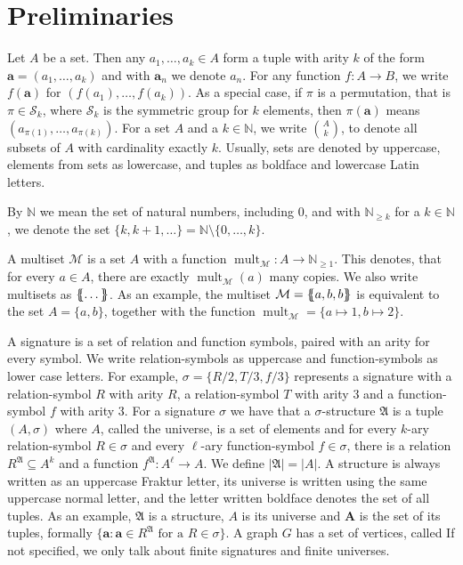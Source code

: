 \section{Preliminaries}
\label{sec:Preliminaries}

Let $A$ be a set.
Then any $a_1,\dots, a_k\in A$ form a tuple with arity $k$ of the form $\mathbf a=(a_1,\dots,a_k)$ and with $\mathbf a_n$ we denote $a_n$.
For any function $f:A\to B$, we write $f(\mathbf a)$ for $(f(a_1),\dots,f(a_k))$.
As a special case, if $\pi$ is a permutation, that is $\pi\in \mathcal S_k$, where $\mathcal S_k$ is the symmetric group for $k$ elements, then $\pi(\mathbf a)$ means $(a_{\pi(1)},\dots,a_{\pi(k)})$.
For a set $A$ and a $k\in \mathbb N$, we write $\binom{A}{k}$, to denote all subsets of $A$ with cardinality exactly $k$.
Usually, sets are denoted by uppercase, elements from sets as lowercase, and tuples as boldface and lowercase Latin letters.

By $\mathbb N$ we mean the set of natural numbers, including $0$, and with $\mathbb N_{\geq k}$ for a $k\in \mathbb N$, we denote the set $\{k,k+1,\dots\}=\mathbb N \setminus \{0,\dots,k\}$.

A multiset $\mathcal M$ is a set $A$ with a function $\operatorname{mult}_{\mathcal M}:A\to \mathbb N_{\geq 1}$.
This denotes, that for every $a\in A$, there are exactly $\operatorname{mult}_{\mathcal M}(a)$ many copies.
We also write multisets as $\left\{\kern-.35em\left\{\dots\right\}\kern-.35em\right\}$.
As an example, the multiset $\mathcal M = \left\{\kern-.35em\left\{a, b, b\right\}\kern-.35em\right\}$ is equivalent to the set $A=\{a,b\}$, together with the function $\operatorname{mult}_{\mathcal M}=\{a\mapsto 1, b\mapsto 2\}$.

A signature is a set of relation and function symbols, paired with an arity for every symbol.
We write relation-symbols as uppercase and function-symbols as lower case letters.
For example, $\sigma=\{R/2, T/3, f/3\}$ represents a signature with a relation-symbol $R$ with arity $R$, a relation-symbol $T$ with arity $3$ and a function-symbol $f$ with arity $3$.
For a signature $\sigma$ we have that a $\sigma$-structure $\mathfrak A$ is a tuple $(A,\sigma)$ where $A$, called the universe, is a set of elements and for every $k$-ary relation-symbol $R\in \sigma$ and every $\ell$-ary function-symbol $f\in \sigma$, there is a relation $R^{\mathfrak A}\subseteq A^k$ and a function $f^{\mathfrak A}:A^\ell \to A$.
We define $\vert \mathfrak A\vert =\vert A \vert$.
A structure is always written as an uppercase Fraktur letter, its universe is written using the same uppercase normal letter, and the letter written boldface denotes the set of all tuples.
As an example, $\mathfrak A$ is a structure, $A$ is its universe and $\mathbf A$ is the set of its tuples, formally $\{\mathbf a : \mathbf a \in R^{\mathfrak A} \text{ for a } R\in\sigma\}$.
A graph $G$ has a set of vertices, called 
If not specified, we only talk about finite signatures and finite universes.

